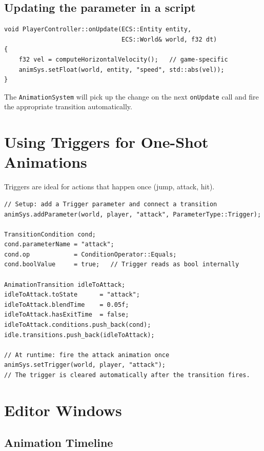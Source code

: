 \subsection{Updating the parameter in a script}

\begin{lstlisting}
void PlayerController::onUpdate(ECS::Entity entity,
                                ECS::World& world, f32 dt)
{
    f32 vel = computeHorizontalVelocity();   // game-specific
    animSys.setFloat(world, entity, "speed", std::abs(vel));
}
\end{lstlisting}

The \texttt{AnimationSystem} will pick up the change on the next
\texttt{onUpdate} call and fire the appropriate transition automatically.

\section{Using Triggers for One-Shot Animations}

Triggers are ideal for actions that happen once (jump, attack, hit).

\begin{lstlisting}
// Setup: add a Trigger parameter and connect a transition
animSys.addParameter(world, player, "attack", ParameterType::Trigger);

TransitionCondition cond;
cond.parameterName = "attack";
cond.op            = ConditionOperator::Equals;
cond.boolValue     = true;   // Trigger reads as bool internally

AnimationTransition idleToAttack;
idleToAttack.toState      = "attack";
idleToAttack.blendTime    = 0.05f;
idleToAttack.hasExitTime  = false;
idleToAttack.conditions.push_back(cond);
idle.transitions.push_back(idleToAttack);

// At runtime: fire the attack animation once
animSys.setTrigger(world, player, "attack");
// The trigger is cleared automatically after the transition fires.
\end{lstlisting}

\section{Editor Windows}

\subsection{Animation Timeline}

